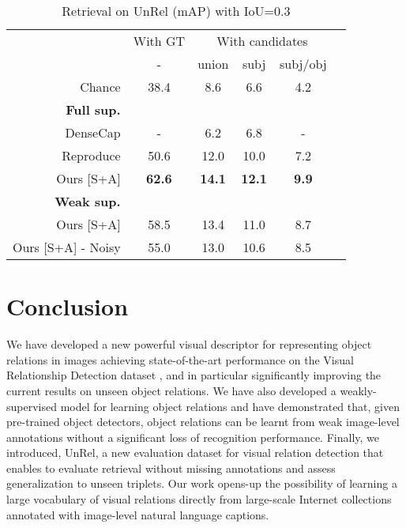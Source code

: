 \documentclass[10pt,twocolumn,letterpaper]{article}
\newcommand{\ra}[1]{\renewcommand{\arraystretch}{#1}}
\begin{document}
\begin{table}\centering
\small{
\ra{1}
\begin{tabular}{@{}rccccc@{}}\toprule
& \multicolumn{1}{c}{With GT} & \multicolumn{3}{c}{With candidates} \\
& - & union & subj & subj/obj
\\\midrule
\rule{0pt}{2ex}  
Chance 					& 38.4	& 8.6 	& 6.6 	& 4.2 \\
\rule{0pt}{2ex}  
\textbf{Full sup.}\\
\rule{0pt}{1ex} 
DenseCap \cite{Johnson2015} 		& - 		& 6.2 	& 6.8 	& - \\
Reproduce \cite{Lu16} 			& 50.6 	& 12.0 	& 10.0 	& 7.2  \\
Ours [S+A] 				&  \textbf{62.6} & \textbf{14.1} & \textbf{12.1} & \textbf{9.9} \\
\rule{0pt}{3ex}  
\textbf{Weak sup.}\\
\rule{0pt}{1ex} 
Ours [S+A] 					&  58.5 		& 13.4 	& 11.0 	& 8.7 \\
Ours [S+A] - Noisy			&  55.0 		& 13.0 	& 10.6	& 8.5 \\
\bottomrule
\end{tabular}
\setlength\abovecaptionskip{5pt}
\caption{Retrieval on UnRel (mAP) with IoU=0.3} 
\label{tab:results_rarerel}
}
\end{table}

\section{Conclusion}
We have developed a new powerful visual descriptor for representing object relations in images achieving state-of-the-art performance on the Visual Relationship Detection dataset \cite{Lu16}, and in particular significantly improving the current results on unseen object relations. We have also developed a weakly-supervised model for learning object relations and have demonstrated that, given pre-trained object detectors, object relations can be learnt from weak image-level annotations without a significant loss of recognition performance. Finally, we introduced, UnRel, a new evaluation dataset for visual relation detection that enables to evaluate retrieval without missing annotations and assess generalization to unseen triplets. Our work opens-up the possibility of learning a large vocabulary of visual relations directly from large-scale Internet collections annotated with image-level natural language captions.    
\end{document}
